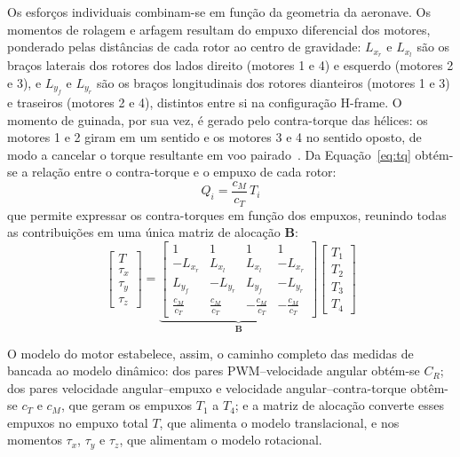 \documentclass{ieeeaccess}
\begin{document}
Os esforços individuais combinam-se em função da geometria da aeronave. Os momentos de rolagem e arfagem resultam do empuxo diferencial dos motores, ponderado pelas distâncias de cada rotor ao centro de gravidade: $L_{x_r}$ e $L_{x_l}$ são os braços laterais dos rotores dos lados direito (motores 1 e 4) e esquerdo (motores 2 e 3), e $L_{y_f}$ e $L_{y_r}$ são os braços longitudinais dos rotores dianteiros (motores 1 e 3) e traseiros (motores 2 e 4), distintos entre si na configuração H-frame. O momento de guinada, por sua vez, é gerado pelo contra-torque das hélices: os motores 1 e 2 giram em um sentido e os motores 3 e 4 no sentido oposto, de modo a cancelar o torque resultante em voo pairado~\cite{c5}. Da Equação~\eqref{eq:tq} obtém-se a relação entre o contra-torque e o empuxo de cada rotor:
\begin{equation}
Q_i = \frac{c_M}{c_T}\,T_i
\label{eq:qt-ratio}
\end{equation}
que permite expressar os contra-torques em função dos empuxos, reunindo todas as contribuições em uma única matriz de alocação $\mathbf{B}$:
\begin{equation}
\begin{bmatrix} T \\ \tau_x \\ \tau_y \\ \tau_z \end{bmatrix}
=
\underbrace{\begin{bmatrix}
1 & 1 & 1 & 1 \\
-L_{x_r} & L_{x_l} & L_{x_l} & -L_{x_r} \\
L_{y_f} & -L_{y_r} & L_{y_f} & -L_{y_r} \\
\tfrac{c_M}{c_T} & \tfrac{c_M}{c_T} & -\tfrac{c_M}{c_T} & -\tfrac{c_M}{c_T}
\end{bmatrix}}_{\mathbf{B}}
\begin{bmatrix} T_1 \\ T_2 \\ T_3 \\ T_4 \end{bmatrix}
\label{eq:aloca}
\end{equation}

O modelo do motor estabelece, assim, o caminho completo das medidas de bancada ao modelo dinâmico: dos pares PWM--velocidade angular obtém-se $C_R$; dos pares velocidade angular--empuxo e velocidade angular--contra-torque obtêm-se $c_T$ e $c_M$, que geram os empuxos $T_1$ a $T_4$; e a matriz de alocação converte esses empuxos no empuxo total $T$, que alimenta o modelo translacional, e nos momentos $\tau_x$, $\tau_y$ e $\tau_z$, que alimentam o modelo rotacional.
\end{document}
